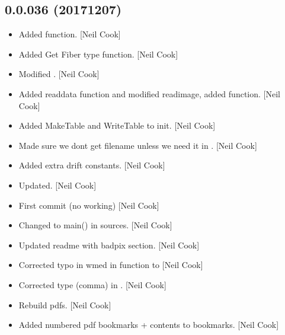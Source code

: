 \documentclass[a4paper,10pt,english]{report}
\begin{document}
\subsection{0.0.036 (2017\sphinxhyphen{}12\sphinxhyphen{}07)}
\label{\detokenize{misc/changelog:id535}}\begin{itemize}
\item {} 
Added  function. {[}Neil Cook{]}

\item {} 
Added Get Fiber type function. {[}Neil Cook{]}

\item {} 
Modified . {[}Neil Cook{]}

\item {} 
Added readdata function and modified readimage, added 
function. {[}Neil Cook{]}

\item {} 
Added MakeTable and WriteTable to init. {[}Neil Cook{]}

\item {} 
Made sure we dont get filename unless we need it in
. {[}Neil Cook{]}

\item {} 
Added extra drift constants. {[}Neil Cook{]}

\item {} 
Updated. {[}Neil Cook{]}

\item {} 
First commit (no working) {[}Neil Cook{]}

\item {} 
Changed  to main() in sources. {[}Neil Cook{]}

\item {} 
Updated readme with badpix section. {[}Neil Cook{]}

\item {} 
Corrected typo in wmed \sphinxhyphen{} in  function
 to  {[}Neil Cook{]}

\item {} 
Corrected type (comma) in . {[}Neil Cook{]}

\item {} 
Rebuild pdfs. {[}Neil Cook{]}

\item {} 
Added numbered pdf bookmarks + contents to bookmarks. {[}Neil Cook{]}


\end{itemize}
\end{document}
